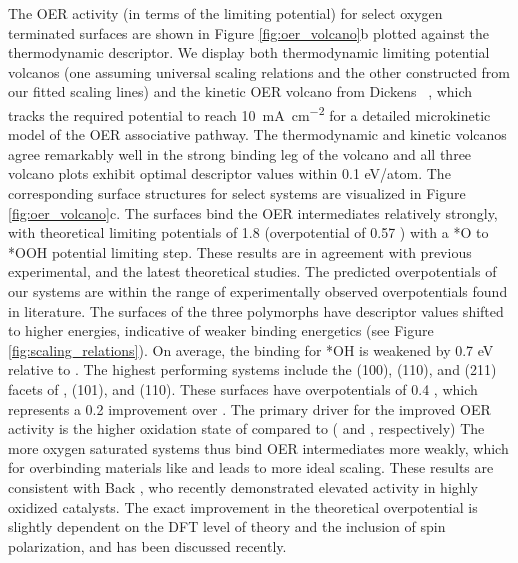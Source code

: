 %
The OER activity (in terms of the limiting potential) for select oxygen terminated surfaces are shown in Figure \ref{fig:oer_volcano}b plotted against the \DGOmOH thermodynamic descriptor.
%
We display both thermodynamic limiting potential volcanos
(one assuming universal scaling relations and the other constructed from our fitted scaling lines)
and the kinetic OER volcano from Dickens ~\cite{Dickens2019},
which tracks the required potential to reach \SI[mode=text]{10}{\mA\per\cm\squared} for a detailed microkinetic model of the OER associative pathway.
%
The thermodynamic and kinetic volcanos agree remarkably well in the strong binding leg of the volcano and all three volcano plots exhibit optimal \DGOmOH descriptor values within \num{0.1} eV/atom.
%
The corresponding surface structures for select systems are visualized in Figure \ref{fig:oer_volcano}c.
%
The \rIrOtwo surfaces bind the OER intermediates relatively strongly,
with theoretical limiting potentials of \mytilde\num{1.8} \VRHE (overpotential of \num{0.57} \VRHE) with a *O to *OOH potential limiting step.
%
These results are in agreement with previous experimental, and the latest theoretical studies.
%
The predicted overpotentials of our \rIrOtwo systems are within the range of experimentally observed overpotentials found in literature.
%
The surfaces of the three \IrOthree polymorphs have \DGOmOH descriptor values shifted to higher energies, indicative of weaker binding energetics (see Figure \ref{fig:scaling_relations}).
%
On average, the binding for *OH is weakened by 0.7 eV relative to \IrOtwo.
%
The highest performing systems include the (100), (110), and (211) facets of \aIrOthree, \bIrOthree (101), and \rIrOthree (110).
%
These surfaces have overpotentials of \mytilde\num{0.4} \VRHE,
which represents a \mytilde\num{0.2} \VRHE improvement over \rIrOtwo.
%
The primary driver for the improved OER activity is the higher oxidation state of \IrOthree compared to \IrOtwo
( and , respectively)
%
The more oxygen saturated \IrOthree systems thus bind OER intermediates more weakly, which for overbinding materials like \IrOtwo and \RhOtwo leads to more ideal scaling.
%
These results are consistent with Back , who recently demonstrated elevated activity in highly oxidized \IrOthree catalysts.\cite{Back2019}
%
The exact improvement in the theoretical overpotential is slightly dependent on the DFT level of theory and the inclusion of spin polarization, and has been discussed recently.~\cite{Seitz2016,Strickler2019}
